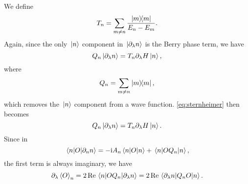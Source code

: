 \documentclass[hyperref, a4paper]{article}
\newcommand*{\ii}{\mathrm{i}}
\begin{document}
We define 
\begin{equation}
    T_n = \sum_{m \neq n} \frac{\dyad{m}}{E_n - E_m}.
\end{equation}
Again, since the only $\ket*{n}$ component in $\ket*{\partial_\lambda n}$ is the Berry phase term, 
we have 
\begin{equation}
    Q_n \ket*{\partial_\lambda n} = T_n \partial_\lambda H \ket*{n},
    \label{eq:q-t-lambda}
\end{equation}
where 
\begin{equation}
    Q_n = \sum_{m \neq n} \dyad{m},
\end{equation}
which removes the $\ket*{n}$ component from a wave function.
\eqref{eq:sternheimer} then becomes 
\begin{equation}
    Q_n \ket*{\partial_\lambda n} = T_n \partial_\lambda H \ket*{n}.
\end{equation}
Since in 
\[
    \mel{n}{O}{\partial_n n} = 
    - \ii A_n \mel{n}{O }{n}
    + \mel{n}{O Q_n}{n},
\]
the first term is always imaginary, we have 
\begin{equation}
    \partial_\lambda \expval{O}_n = 2 \Re \mel{n}{O Q_n}{\partial_\lambda n}
    = 2 \Re \mel{\partial_\lambda n}{Q_n O}{n}.
\end{equation}
\end{document}
